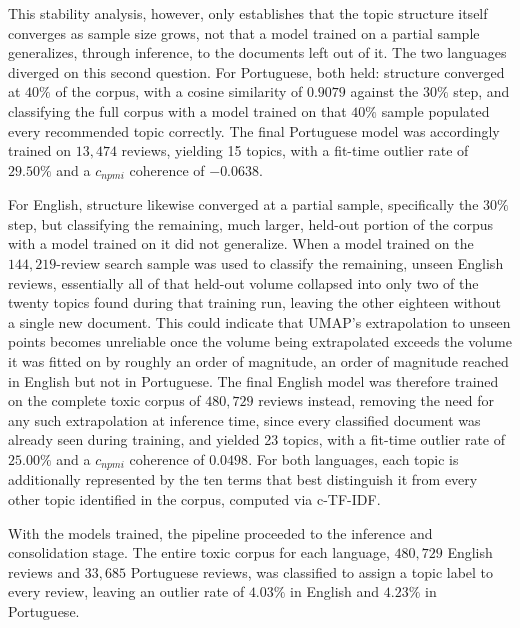This stability analysis, however, only establishes that the topic structure itself converges as sample size grows, not that a model trained on a partial sample generalizes, through inference, to the documents left out of it. The two languages diverged on this second question. For Portuguese, both held: structure converged at $40\%$ of the corpus, with a cosine similarity of $0.9079$ against the $30\%$ step, and classifying the full corpus with a model trained on that $40\%$ sample populated every recommended topic correctly. The final Portuguese model was accordingly trained on $13{,}474$ reviews, yielding 15 topics, with a fit-time outlier rate of $29.50\%$ and a $c_{npmi}$ coherence of $-0.0638$.

For English, structure likewise converged at a partial sample, specifically the $30\%$ step, but classifying the remaining, much larger, held-out portion of the corpus with a model trained on it did not generalize. When a model trained on the $144{,}219$-review search sample was used to classify the remaining, unseen English reviews, essentially all of that held-out volume collapsed into only two of the twenty topics found during that training run, leaving the other eighteen without a single new document. This could indicate that UMAP's extrapolation to unseen points becomes unreliable once the volume being extrapolated exceeds the volume it was fitted on by roughly an order of magnitude, an order of magnitude reached in English but not in Portuguese. The final English model was therefore trained on the complete toxic corpus of $480{,}729$ reviews instead, removing the need for any such extrapolation at inference time, since every classified document was already seen during training, and yielded 23 topics, with a fit-time outlier rate of $25.00\%$ and a $c_{npmi}$ coherence of $0.0498$. For both languages, each topic is additionally represented by the ten terms that best distinguish it from every other topic identified in the corpus, computed via c-TF-IDF.

With the models trained, the pipeline proceeded to the inference and consolidation stage. The entire toxic corpus for each language, $480{,}729$ English reviews and $33{,}685$ Portuguese reviews, was classified to assign a topic label to every review, leaving an outlier rate of $4.03\%$ in English and $4.23\%$ in Portuguese.

